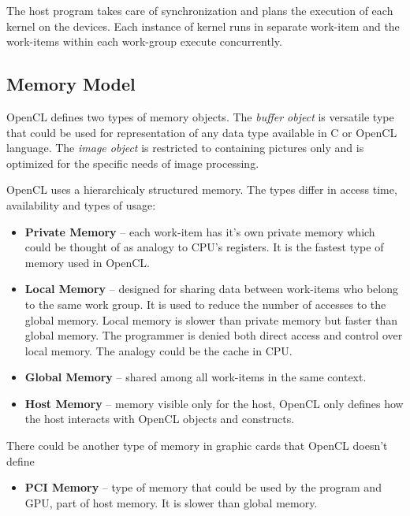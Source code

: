 The host program takes care of synchronization and plans the execution of each
kernel on the devices. Each instance of kernel runs in separate work-item and 
the work-items within each work-group execute concurrently. 

\subsection{Memory Model}
OpenCL defines two types of memory objects. The \textit{buffer object} is
versatile type that could be used for representation of any data type 
available in C or OpenCL language. The \textit{image object} is restricted 
to containing pictures only and is optimized for the specific needs of 
image processing.

OpenCL uses a hierarchicaly structured memory. The types differ in access time,
availability and types of usage\cite{opencl}:
\begin{itemize}
\item \textbf{Private Memory} -- each work-item has it's own private memory 
which could be thought of as analogy to CPU's registers. It is the fastest type 
of memory used in OpenCL.
\item \textbf{Local Memory} -- designed for sharing data between work-items who 
belong to the same work group. It is used to reduce the number of accesses to 
the global memory. Local memory is slower than private memory but faster than 
global memory. The programmer is denied both direct access and control over 
local memory. The analogy could be the cache in CPU.
\item \textbf{Global Memory} -- shared among all work-items in the same context.
\item \textbf{Host Memory} -- memory visible only for the host, OpenCL only 
defines how the host interacts with OpenCL objects and constructs.
\end{itemize}

\hspace{-1.5em}
There could be another type of memory in graphic cards that OpenCL doesn't 
define

\begin{itemize}
\item \textbf{PCI Memory} -- type of memory that could be used by the program 
and GPU, part of host memory. It is slower than global memory.
\end{itemize}



